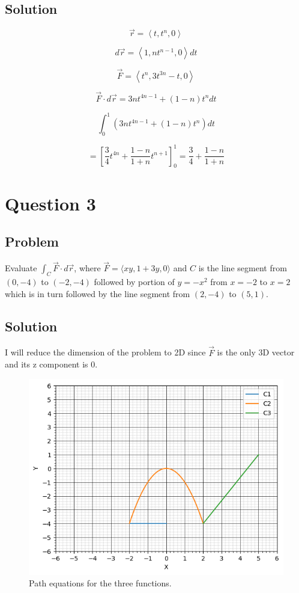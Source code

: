 \documentclass[12pt]{article}
\begin{document}
\subsection{Solution}

\[
    \vec{r} = \left\langle t, t^n, 0\right\rangle
\]

\[
    d \vec{r} = \left\langle 1, n t^{n - 1}, 0\right\rangle d t
\]

\[
    \vec{F} = \left\langle t^n, 3t^{3n} - t, 0\right\rangle
\]

\[
    \vec{F} \cdot d \vec{r} = 3 n t^{4n - 1} + (1 - n) t^n d t
\]

\[
    \int_{0}^{1} \left(3 n t^{4n - 1} + (1 - n) t^n\right) d t
\]

\[
    = {\left[\frac{3}{4} t^{4n} + \frac{1 - n}{1 + n} t^{n + 1}\right]}_{0}^{1}
    = \frac{3}{4} + \frac{1 - n}{1 + n}
\]

\newpage
\section{Question 3}

\subsection{Problem}

Evaluate \(\int_C \vec{F} \cdot d \vec{r}\), where \(\vec{F} = \langle xy, 1 + 3y, 0\rangle \) and
\(C\) is the line segment from \((0, -4)\) to \((-2, -4)\) followed by portion of \(y = -x^2\)
from \(x = -2\) to \(x = 2\) which is in turn followed by the line segment from \((2, -4)\)
to \((5, 1)\).

\subsection{Solution}

I will reduce the dimension of the problem to 2D since \(\vec{F}\) is the
only 3D vector and its z component is 0.

\begin{figure}[H]
    \includegraphics[width=\linewidth]{Q3.png}
    \caption{Path equations for the three functions.\cite{El-Deeb_PEU-218_Assignments_py}}\label{fig:Q3}
\end{figure}
\end{document}
